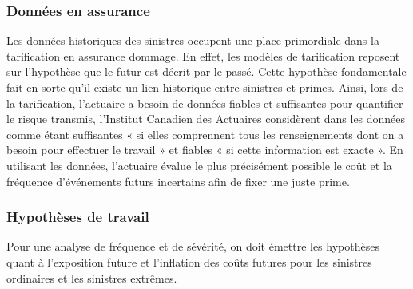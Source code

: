 \documentclass[11pt]{article}
\begin{document}
\subsubsection{Données en assurance}
Les données historiques des sinistres occupent une place primordiale dans la tarification en assurance dommage. En effet, les modèles de tarification reposent sur l'hypothèse que le futur est décrit par le passé. Cette hypothèse fondamentale fait en sorte qu'il existe un lien historique entre sinistres et primes. Ainsi, lors de la tarification, l'actuaire a besoin de données fiables et suffisantes pour quantifier le risque transmis, l'Institut Canadien des Actuaires considèrent dans \cite{ICA} les données comme étant suffisantes « si elles comprennent tous les renseignements dont on a besoin pour effectuer le travail » et fiables « si cette information est exacte ». En utilisant les données, l'actuaire évalue le plus précisément possible le coût et la fréquence d'événements futurs incertains afin de fixer une juste prime.\\
\subsubsection{Hypothèses de travail}
Pour une analyse de fréquence et de sévérité, on doit émettre les hypothèses quant à l'exposition future et l'inflation des coûts futures pour les sinistres ordinaires et les sinistres extrêmes. \\
\end{document}
